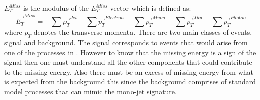 $E_T^{Miss}$ is the modulus of the $E_T^{Miss}$ vector which is defined as:
\begin{equation}\label{eq:etmiss}
\vec{E_T}^{Miss} = - \sum \vec{p_T}^{Jet} - \sum \vec{p_T}^{Electron} - \sum \vec{p_T}^{Muon} - \sum \vec{p_T}^{Tau} - \sum \vec{p_T}^{Photon}
\end{equation}  
where $p_T$ denotes the transverse momenta.
There are two main classes of events, signal and background. 
The signal corresponds to events that would arise from one of the processes in . However to know that the missing energy is a sign of the signal then one must understand all the other components that could contribute to the missing energy. Also there must be an excess of missing energy from what is expected from the background this since the background comprises of standard model processes that can mimic the mono-jet signature.
